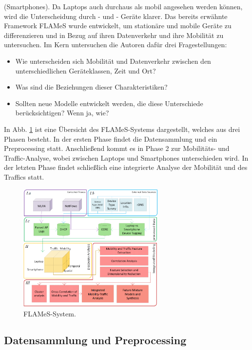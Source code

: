 \documentclass[12pt, a4paper]{article}
\begin{document}
(Smartphones). Da Laptops auch durchaus als mobil angesehen werden können, wird die Unterscheidung durch - und -
Geräte klarer. Das bereits erwähnte Framework FLAMeS wurde entwickelt, um stationäre und mobile Geräte zu differenzieren
und in Bezug auf ihren Datenverkehr und ihre Mobilität zu untersuchen.
\newline\newline
Im Kern untersuchen die Autoren dafür drei Fragestellungen:\newline
\begin{itemize}
    \item Wie unterscheiden sich Mobilität und Datenverkehr zwischen den unterschiedlichen Geräteklassen, Zeit und Ort?
    \item Was sind die Beziehungen dieser Charakteristiken?
    \item Sollten neue Modelle entwickelt werden, die diese Unterschiede berücksichtigen? Wenn ja, wie?
\end{itemize}
\pagebreak
In Abb. \ref{fig:flames} ist eine Übersicht des FLAMeS-Systems dargestellt, welches aus drei Phasen besteht.
In der ersten Phase findet die Datensammlung und ein Preprocessing statt. Anschließend kommt es in Phase 2
zur Mobilitäts- und Traffic-Analyse, wobei zwischen Laptops und Smartphones unterschieden wird. In der letzten
Phase findet schließlich eine integrierte Analyse der Mobilität und des Traffics statt.
\begin{figure}[H]
\centering
\includegraphics[width=0.65\textwidth]{img/FLAMeS.png}
\caption{FLAMeS-System. \cite{Alipour2018}}
\label{fig:flames}
\end{figure}

\subsection{Datensammlung und Preprocessing}
\end{document}
